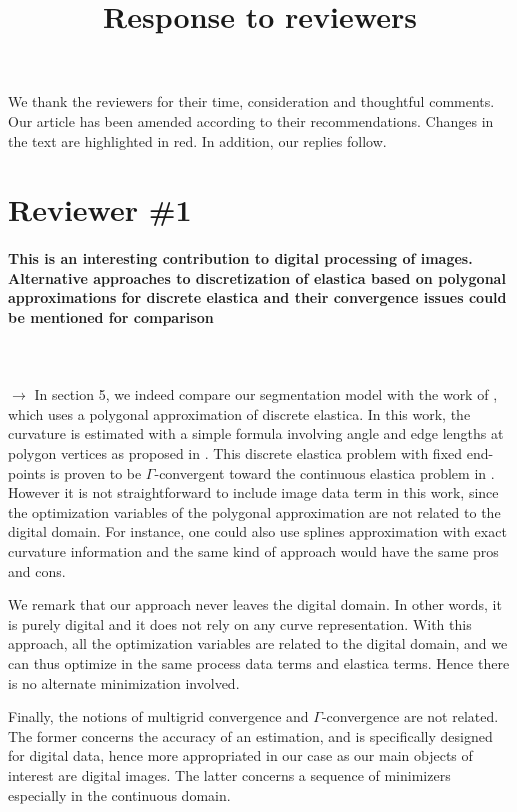 \documentclass[12pt]{article}
\title{Response to reviewers}
\date{}
\begin{document}
\maketitle

We thank the reviewers for their time, consideration and thoughtful comments. Our article has been amended
according to their recommendations. Changes in the text are highlighted in red. In addition, our replies follow.

\section{Reviewer \#1}

\paragraph{This is an interesting contribution to digital processing of images. Alternative approaches to discretization of elastica based on polygonal approximations for discrete elastica and their convergence issues could be mentioned for comparison}

~\\
~\\
$\rightarrow$ In section 5, we indeed compare our segmentation model with the
work of \cite{schoenemann09linear}, which uses a polygonal
approximation of discrete elastica. In this work, the curvature is
estimated with a simple formula involving angle and edge lengths at
polygon vertices as proposed in \cite{bruckstein96}. This discrete
elastica problem with fixed end-points is proven to be
$\Gamma$-convergent toward the continuous elastica problem in
\cite{bruckstein01}. However it is not straightforward to include
image data term in this work, since the optimization variables of the
polygonal approximation are not related to the digital domain. For
instance, one could also use splines approximation with exact
curvature information and the same kind of approach would have the
same pros and cons.

We remark that our approach never leaves the digital domain. In other
words, it is purely digital and it does not rely on any curve
representation. With this approach, all the optimization variables are
related to the digital domain, and we can thus optimize in the same
process data terms and elastica terms. Hence there is no alternate
minimization involved.

Finally, the notions of multigrid convergence and $\Gamma$-convergence
are not related. The former concerns the accuracy of an
estimation, and is specifically designed for digital data, hence more appropriated in
our case as our main objects of interest are digital images.  The latter concerns a
sequence of minimizers especially in the continuous domain.~\\
\end{document}
